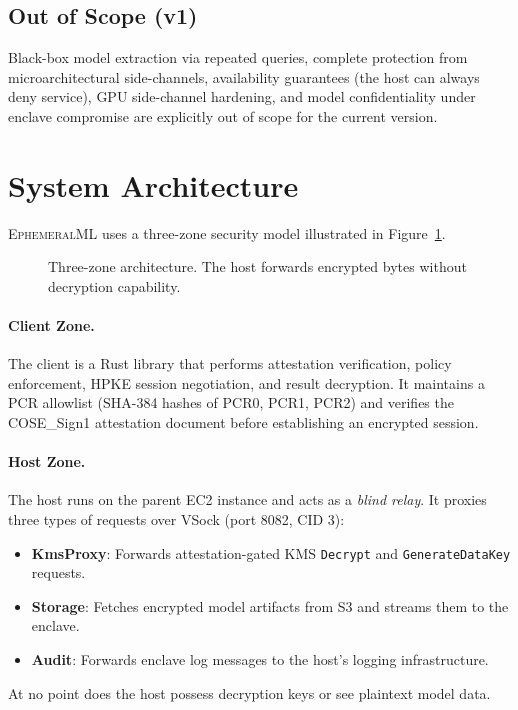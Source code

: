\documentclass[11pt,a4paper]{article}
\begin{document}
\subsection{Out of Scope (v1)}

Black-box model extraction via repeated queries, complete protection from microarchitectural side-channels, availability guarantees (the host can always deny service), GPU side-channel hardening, and model confidentiality under enclave compromise are explicitly out of scope for the current version.

\section{System Architecture}
\label{sec:architecture}

\textsc{EphemeralML} uses a three-zone security model illustrated in Figure~\ref{fig:zones}.

\begin{figure}[ht]
\centering
{}
\caption{Three-zone architecture. The host forwards encrypted bytes without decryption capability.}
\label{fig:zones}
\end{figure}

\paragraph{Client Zone.}
The client is a Rust library that performs attestation verification, policy enforcement, HPKE session negotiation, and result decryption.
It maintains a PCR allowlist (SHA-384 hashes of PCR0, PCR1, PCR2) and verifies the COSE\_Sign1 attestation document before establishing an encrypted session.

\paragraph{Host Zone.}
The host runs on the parent EC2 instance and acts as a \emph{blind relay}.
It proxies three types of requests over VSock (port 8082, CID 3):
\begin{itemize}
  \item \textbf{KmsProxy}: Forwards attestation-gated KMS \texttt{Decrypt} and \texttt{GenerateDataKey} requests.
  \item \textbf{Storage}: Fetches encrypted model artifacts from S3 and streams them to the enclave.
  \item \textbf{Audit}: Forwards enclave log messages to the host's logging infrastructure.
\end{itemize}
At no point does the host possess decryption keys or see plaintext model data.
\end{document}
